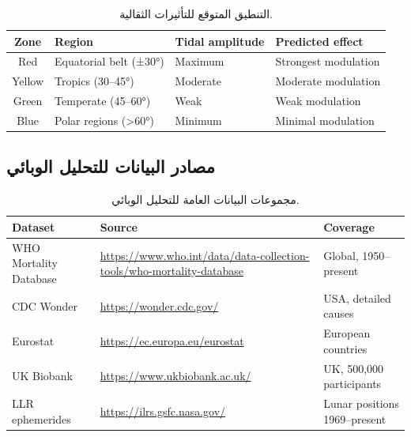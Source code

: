 \documentclass[11pt,a4paper]{article}
\theoremstyle{remark}
\begin{document}
	\begin{table}[htbp]
		\begin{otherlanguage}{english}
			\centering
			\caption{Expected zonation of gravitational effects}
			\label{tab:zonation}
			\small
			\begin{tabular}{clll}
				\toprule
				\textbf{Zone} & \textbf{Region} & \textbf{Tidal amplitude} & \textbf{Predicted effect} \\
				\midrule
				Red & Equatorial belt (±30°) & Maximum & Strongest modulation \\
				Yellow & Tropics (30–45°) & Moderate & Moderate modulation \\
				Green & Temperate (45–60°) & Weak & Weak modulation \\
				Blue & Polar regions (>60°) & Minimum & Minimal modulation \\
				\bottomrule
			\end{tabular}
		\end{otherlanguage}
		\caption{التنطيق المتوقع للتأثيرات الثقالية.}
	\end{table}
	
	\subsection{مصادر البيانات للتحليل الوبائي}
	
	\begin{table}[htbp]
		\begin{otherlanguage}{english}
			\centering
			\caption{Public datasets for epidemiological analysis}
			\label{tab:data-sources}
			\small
			\begin{tabular}{p{3.2cm}p{6.5cm}p{2.8cm}}
				\toprule
				\textbf{Dataset} & \textbf{Source} & \textbf{Coverage} \\
				\midrule
				WHO Mortality Database & 
				\url{https://www.who.int/data/data-collection-tools/who-mortality-database} & 
				Global, 1950--present \\
				CDC Wonder & 
				\url{https://wonder.cdc.gov/} & 
				USA, detailed causes \\
				Eurostat & 
				\url{https://ec.europa.eu/eurostat} & 
				European countries \\
				UK Biobank & 
				\url{https://www.ukbiobank.ac.uk/} & 
				UK, 500,000 participants \\
				LLR ephemerides & 
				\url{https://ilrs.gsfc.nasa.gov/} & 
				Lunar positions 1969--present \\
				\bottomrule
			\end{tabular}
		\end{otherlanguage}
		\caption{مجموعات البيانات العامة للتحليل الوبائي.}
	\end{table}
	
\end{document}
